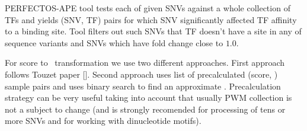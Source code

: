 PERFECTOS-APE tool tests each of given SNVs against a whole collection of TFs and yields (SNV, TF) pairs for which SNV significantly affected TF affinity to a binding site. Tool filters out such SNVs that TF doesn't have a site in any of sequence variants and SNVs which have fold change close to $1.0$.

For score to \pvalue\ transformation we use two different approaches. First approach follows Touzet paper []. Second approach uses list of precalculated (score, \pvalue) sample pairs and uses binary search to find an approximate \pvalue. Precalculation strategy can be very useful taking into account that usually PWM collection is not a subject to change (and is strongly recomended for processing of tens or more SNVs and for working with dinucleotide motifs).
